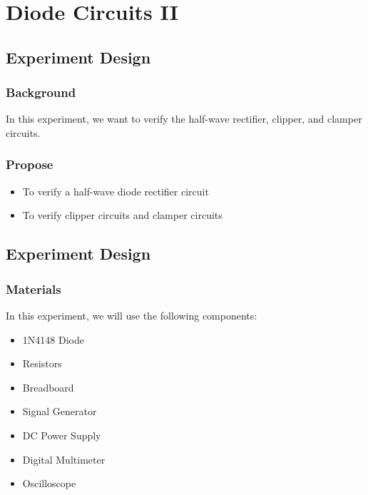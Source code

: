 \section{Diode Circuits II}

\subsection{Experiment Design}
    \subsubsection{Background}
    In this experiment, we want to verify the half-wave rectifier, clipper, and clamper circuits.

    \subsubsection{Propose}
    \begin{itemize}
        \item To verify a half-wave diode rectifier circuit
        \item To verify clipper circuits and clamper circuits
    \end{itemize}

\subsection{Experiment Design}
    \subsubsection{Materials}
        In this experiment, we will use the following components:
        \begin{itemize}
            \item 1N4148 Diode
            \item Resistors
            \item Breadboard
            \item Signal Generator
            \item DC Power Supply
            \item Digital Multimeter
            \item Oscilloscope
        \end{itemize}

